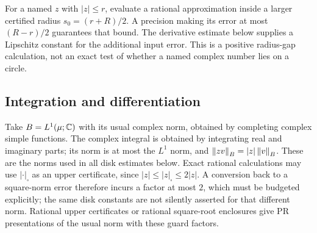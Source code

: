 For a named $z$ with $|z|\le r$, evaluate a rational approximation inside
a larger certified radius $s_0=(r+R)/2$. A precision making its error
at most $(R-r)/2$ guarantees that bound. The derivative estimate below
supplies a Lipschitz constant for the additional input error. This is a
positive radius-gap calculation, not an exact test of whether a named
complex number lies on a circle.

\subsection{Integration and differentiation}

Take $B=L^1(\mu;\mathbb C)$ with its usual complex norm, obtained by completing
complex simple functions. The complex integral is obtained by integrating
real and imaginary parts; its norm is at most the $L^1$ norm, and
$\left\lVert zv\right\rVert_B=|z|\left\lVert v\right\rVert_B$. These are the norms used in all disk
estimates below. Exact rational calculations may use
$|\cdot|_\square$ as an upper certificate, since
$|z|\le|z|_\square\le2|z|$. A conversion back to a square-norm error
therefore incurs a factor at most $2$, which must be budgeted explicitly;
the same disk constants are not silently asserted for that different
norm. Rational upper certificates or rational square-root enclosures
give PR presentations of the usual norm with these guard factors.

